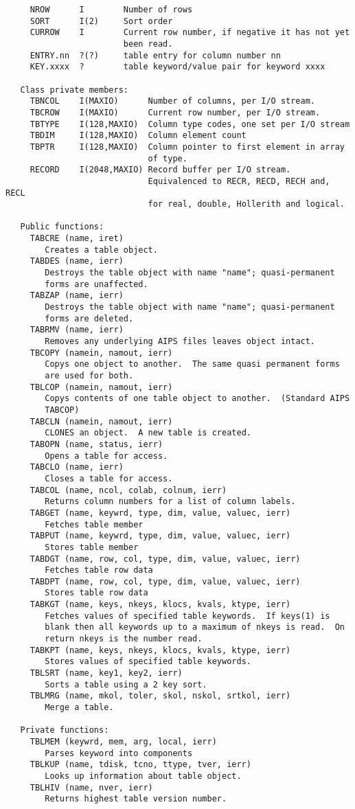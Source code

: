 {\small\begin{verbatim}
     NROW      I        Number of rows
     SORT      I(2)     Sort order
     CURROW    I        Current row number, if negative it has not yet
                        been read.
     ENTRY.nn  ?(?)     table entry for column number nn
     KEY.xxxx  ?        table keyword/value pair for keyword xxxx

   Class private members:
     TBNCOL    I(MAXIO)      Number of columns, per I/O stream.
     TBCROW    I(MAXIO)      Current row number, per I/O stream.
     TBTYPE    I(128,MAXIO)  Column type codes, one set per I/O stream
     TBDIM     I(128,MAXIO)  Column element count
     TBPTR     I(128,MAXIO)  Column pointer to first element in array
                             of type.
     RECORD    I(2048,MAXIO) Record buffer per I/O stream.
                             Equivalenced to RECR, RECD, RECH and, RECL
                             for real, double, Hollerith and logical.

   Public functions:
     TABCRE (name, iret)
        Creates a table object.
     TABDES (name, ierr)
        Destroys the table object with name "name"; quasi-permanent
        forms are unaffected.
     TABZAP (name, ierr)
        Destroys the table object with name "name"; quasi-permanent
        forms are deleted.
     TABRMV (name, ierr)
        Removes any underlying AIPS files leaves object intact.
     TBCOPY (namein, namout, ierr)
        Copys one object to another.  The same quasi permanent forms
        are used for both.
     TBLCOP (namein, namout, ierr)
        Copys contents of one table object to another.  (Standard AIPS
        TABCOP)
     TABCLN (namein, namout, ierr)
        CLONES an object.  A new table is created.
     TABOPN (name, status, ierr)
        Opens a table for access.
     TABCLO (name, ierr)
        Closes a table for access.
     TABCOL (name, ncol, colab, colnum, ierr)
        Returns column numbers for a list of column labels.
     TABGET (name, keywrd, type, dim, value, valuec, ierr)
        Fetches table member
     TABPUT (name, keywrd, type, dim, value, valuec, ierr)
        Stores table member
     TABDGT (name, row, col, type, dim, value, valuec, ierr)
        Fetches table row data
     TABDPT (name, row, col, type, dim, value, valuec, ierr)
        Stores table row data
     TABKGT (name, keys, nkeys, klocs, kvals, ktype, ierr)
        Fetches values of specified table keywords.  If keys(1) is
        blank then all keywords up to a maximum of nkeys is read.  On
        return nkeys is the number read.
     TABKPT (name, keys, nkeys, klocs, kvals, ktype, ierr)
        Stores values of specified table keywords.
     TBLSRT (name, key1, key2, ierr)
        Sorts a table using a 2 key sort.
     TBLMRG (name, mkol, toler, skol, nskol, srtkol, ierr)
        Merge a table.

   Private functions:
     TBLMEM (keywrd, mem, arg, local, ierr)
        Parses keyword into components
     TBLKUP (name, tdisk, tcno, ttype, tver, ierr)
        Looks up information about table object.
     TBLHIV (name, nver, ierr)
        Returns highest table version number.
\end{verbatim}}
